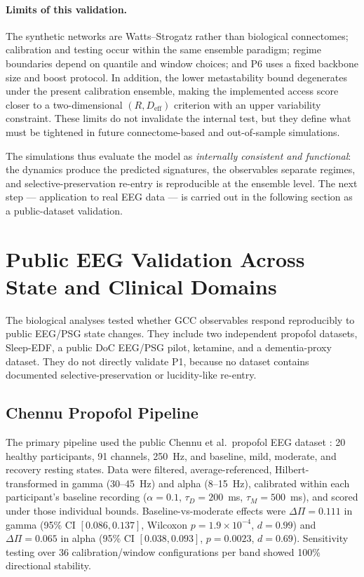 \documentclass[11pt,a4paper]{article}
\theoremstyle{plain}
\theoremstyle{definition}
\theoremstyle{remark}
\begin{document}
\paragraph{Limits of this validation.} The synthetic networks are Watts--Strogatz rather than biological connectomes; calibration and testing occur within the same ensemble paradigm; regime boundaries depend on quantile and window choices; and P6 uses a fixed backbone size and boost protocol. In addition, the lower metastability bound degenerates under the present calibration ensemble, making the implemented access score closer to a two-dimensional $(R,D_{\mathrm{eff}})$ criterion with an upper variability constraint. These limits do not invalidate the internal test, but they define what must be tightened in future connectome-based and out-of-sample simulations.

The simulations thus evaluate the model as \emph{internally consistent and functional}: the dynamics produce the predicted signatures, the observables separate regimes, and selective-preservation re-entry is reproducible at the ensemble level. The next step --- application to real EEG data --- is carried out in the following section as a public-dataset validation.


\section{Public EEG Validation Across State and Clinical Domains}
\label{sec:pilot}

The biological analyses tested whether GCC observables respond reproducibly to public EEG/PSG state changes. They include two independent propofol datasets, Sleep-EDF, a public DoC EEG/PSG pilot, ketamine, and a dementia-proxy dataset. They do not directly validate P1, because no dataset contains documented selective-preservation or lucidity-like re-entry.

\subsection{Chennu Propofol Pipeline}

The primary pipeline used the public Chennu et al.\ propofol EEG dataset \citep{chennu2016}: 20 healthy participants, 91 channels, 250~Hz, and baseline, mild, moderate, and recovery resting states. Data were filtered, average-referenced, Hilbert-transformed in gamma (30--45~Hz) and alpha (8--15~Hz), calibrated within each participant's baseline recording ($\alpha=0.1$, $\tau_D=200$~ms, $\tau_M=500$~ms), and scored under those individual bounds. Baseline-vs-moderate effects were $\Delta\Pi=0.111$ in gamma (95\% CI $[0.086,0.137]$, Wilcoxon $p=1.9\times10^{-4}$, $d=0.99$) and $\Delta\Pi=0.065$ in alpha (95\% CI $[0.038,0.093]$, $p=0.0023$, $d=0.69$). Sensitivity testing over 36 calibration/window configurations per band showed 100\% directional stability.
\end{document}
